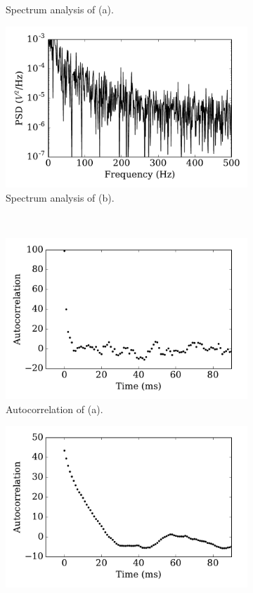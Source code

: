 \documentclass[runningheads,a4paper]{llncs}
\begin{document}
\begin{figure}[tbp!]
\begin{subfigure}[t]{0.43\textwidth}
		\caption{Spectrum analysis of (a).}
	\end{subfigure}
	\begin{subfigure}[t]{0.43\textwidth}
		\includegraphics[width=\textwidth]{psd_tau10.pdf}
		\caption{Spectrum analysis of (b).}
	\end{subfigure}\\
	\begin{subfigure}[t]{0.43\textwidth}
		\includegraphics[width=\textwidth]{autocorr_tau1.pdf}
		\caption{Autocorrelation of (a).}
	\end{subfigure}
	\begin{subfigure}[t]{0.43\textwidth}
		\includegraphics[width=\textwidth]{autocorr_tau10.pdf}

\end{subfigure}
\end{figure}
\end{document}
